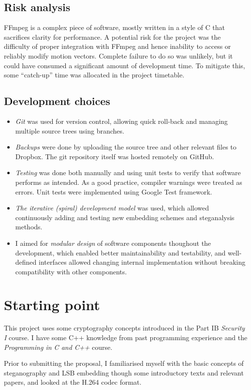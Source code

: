 \documentclass[12pt,british,twoside,notitlepage,usenames,dvipsnames,hypens,final]{report}
\numberwithin{equation}{section}
\numberwithin{figure}{section}
\begin{document}
\subsection{Risk analysis}
FFmpeg is a complex piece of software, mostly written in a style of C that sacrifices clarity for performance. A potential risk for the project was the difficulty of proper integration with FFmpeg and hence inability to access or reliably modify motion vectors. Complete failure to do so was unlikely, but it could have consumed a significant amount of development time. To mitigate this, some ``catch-up'' time was allocated in the project timetable.   

\subsection{Development choices}
\begin{itemize}
\item \emph{Git} was used for version control, allowing quick roll-back and managing multiple source trees using branches.
\item \emph{Backups} were done by uploading the source tree and other relevant files to Dropbox. The git repository itself was hosted remotely on GitHub.
\item \emph{Testing} was done both manually and using unit tests to verify that software performs as intended. As a good practice, compiler warnings were treated as errors. Unit tests were implemented using Google Test framework.
\item \emph{The iterative (spiral) development model} was used, which allowed continuously adding and testing new embedding schemes and steganalysis methods.
\item I aimed for \emph{modular design} of software components thoughout the development, which enabled better maintainability and testability, and well-defined interfaces allowed changing internal implementation without breaking compatibility with other components.
\end{itemize}

\section{Starting point}
This project uses some cryptography concepts introduced in the Part IB \textit{Security I} course. I have some C++ knowledge from past programming experience and the \textit{Programming in C and C++} course. 

Prior to submitting the proposal, I familiarised myself with the basic concepts of steganography and LSB embedding though some introductory texts and relevant papers, and looked at the H.264 codec format.
\end{document}
